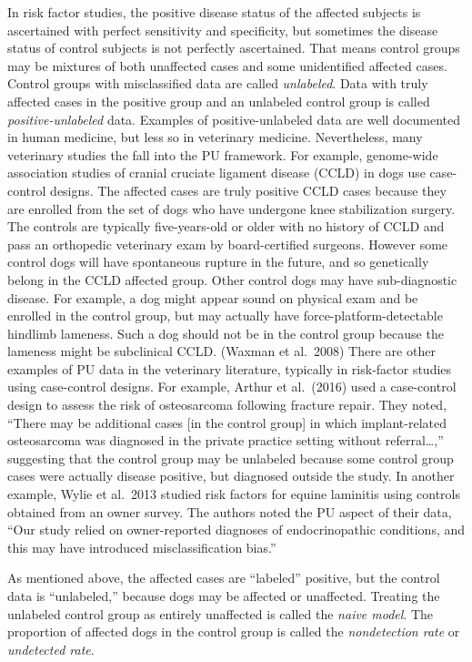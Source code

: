 \documentclass[
]{article}
\begin{document}
In risk factor studies, the positive disease status of the affected
subjects is ascertained with perfect sensitivity and specificity, but
sometimes the disease status of control subjects is not perfectly
ascertained. That means control groups may be mixtures of both
unaffected cases and some unidentified affected cases. Control groups
with misclassified data are called \emph{unlabeled}. Data with truly
affected cases in the positive group and an unlabeled control group is
called \emph{positive-unlabeled} data. Examples of positive-unlabeled
data are well documented in human medicine, but less so in veterinary
medicine. Nevertheless, many veterinary studies the fall into the PU
framework. For example, genome-wide association studies of cranial
cruciate ligament disease (CCLD) in dogs use case-control designs. The
affected cases are truly positive CCLD cases because they are enrolled
from the set of dogs who have undergone knee stabilization surgery. The
controls are typically five-years-old or older with no history of CCLD
and pass an orthopedic veterinary exam by board-certified surgeons.
However some control dogs will have spontaneous rupture in the future,
and so genetically belong in the CCLD affected group. Other control dogs
may have sub-diagnostic disease. For example, a dog might appear sound
on physical exam and be enrolled in the control group, but may actually
have force-platform-detectable hindlimb lameness. Such a dog should not
be in the control group because the lameness might be subclinical CCLD.
(Waxman et al.~2008) There are other examples of PU data in the
veterinary literature, typically in risk-factor studies using
case-control designs. For example, Arthur et al.~(2016) used a
case-control design to assess the risk of osteosarcoma following
fracture repair. They noted, ``There may be additional cases {[}in the
control group{]} in which implant-related osteosarcoma was diagnosed in
the private practice setting without referral\ldots,'' suggesting that
the control group may be unlabeled because some control group cases were
actually disease positive, but diagnosed outside the study. In another
example, Wylie et al.~2013 studied risk factors for equine laminitis
using controls obtained from an owner survey. The authors noted the PU
aspect of their data, ``Our study relied on owner-reported diagnoses of
endocrinopathic conditions, and this may have introduced
misclassification bias.''

As mentioned above, the affected cases are ``labeled'' positive, but the
control data is ``unlabeled,'' because dogs may be affected or
unaffected. Treating the unlabeled control group as entirely unaffected
is called the \emph{naive model}. The proportion of affected dogs in the
control group is called the \emph{nondetection rate} or \emph{undetected
rate}.
\end{document}
